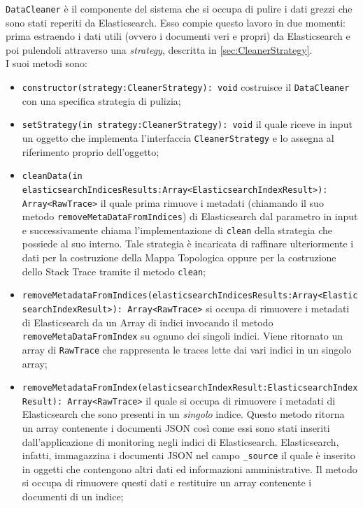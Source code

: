 \label{sec:DataCleaner}
\texttt{DataCleaner} è il componente del sistema che si occupa di pulire i dati grezzi che sono stati reperiti da Elasticsearch. Esso compie questo lavoro in due momenti: prima estraendo i dati utili (ovvero i documenti veri e propri) da Elasticsearch e poi pulendoli attraverso una \emph{strategy}, descritta in \ref{sec:CleanerStrategy}.\\
I suoi metodi sono:

\begin{itemize} 
	\item  \texttt{constructor(strategy:CleanerStrategy): void} costruisce il \texttt{DataCleaner} con una specifica strategia di pulizia;
	\item \texttt{setStrategy(in strategy:CleanerStrategy): void} il quale riceve in input un oggetto che implementa l'interfaccia \texttt{CleanerStrategy} e lo assegna al riferimento proprio dell'oggetto;

	\item \texttt{cleanData(in elasticsearchIndicesResults:Array<ElasticsearchIndexResult>): Array<RawTrace>} il quale prima rimuove i metadati (chiamando il suo metodo \texttt{removeMetaDataFromIndices}) di Elasticsearch dal parametro in input e successivamente chiama l'implementazione di \texttt{clean} della strategia che possiede al suo interno.  Tale strategia è incaricata di raffinare ulteriormente i dati per la costruzione della Mappa Topologica oppure per la costruzione dello Stack Trace tramite il metodo \texttt{clean};

	\item \texttt{removeMetadataFromIndices(elasticsearchIndicesResults:Array<ElasticsearchIndexResult>): Array<RawTrace>}  si occupa di rimuovere i metadati di Elasticsearch da un Array di indici invocando il metodo \texttt{removeMetaDataFromIndex} su ognuno dei singoli indici. Viene ritornato un array di \texttt{RawTrace} che rappresenta le traces lette dai vari indici in un singolo array;

	\item \texttt{removeMetadataFromIndex(elasticsearchIndexResult:ElasticsearchIndexResult): Array<RawTrace>} il quale si occupa di rimuovere i metadati di Elasticsearch che sono presenti in un \emph{singolo} indice. Questo metodo ritorna un array contenente i documenti JSON così come essi sono stati inseriti dall'applicazione di monitoring negli indici di Elasticsearch. Elasticsearch, infatti, immagazzina i documenti JSON nel campo \texttt{\_source} il quale è inserito in oggetti che contengono altri dati ed informazioni amministrative. Il metodo si occupa di rimuovere questi dati e restituire un array contenente i documenti di un indice;
\end{itemize}

